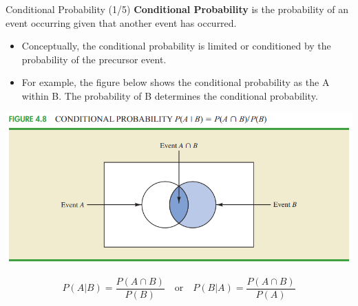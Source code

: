 \documentclass{beamer}
\begin{document}
\begin{frame}{Conditional Probability (1/5)}
\textbf{Conditional Probability} is the probability of an event occurring given that another event has occurred. 

\begin{itemize}
\item Conceptually, the conditional probability is limited or  conditioned by the probability of the precursor event. 
\item For example, the figure below shows the conditional probability as the A within B. The probability of B determines the conditional probability.

\end{itemize}

\begin{center}
\includegraphics[scale=0.3]{images/ch3ConditionalProbability.png}
\end{center}
$$ P(A|B) = \frac{P(A \cap B)}{P(B)} \quad \text{or} \quad P(B|A) = \frac{P(A \cap B)}{P(A)}$$ 

\end{frame}
\end{document}
